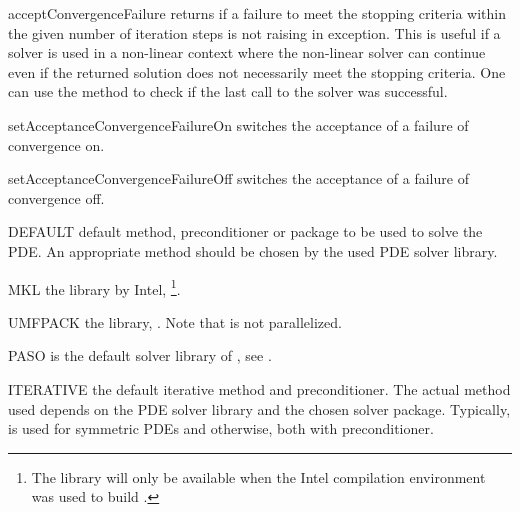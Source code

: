 \begin{methoddesc}[SolverOptions]{acceptConvergenceFailure}{}
returns \True if a failure to meet the stopping criteria within the given
number of iteration steps is not raising in exception. This is useful
if a solver is used in a non-linear context where the non-linear solver can
continue even if the returned solution does not necessarily meet the stopping
criteria. One can use the  method to check if the
last call to the solver was successful.
\end{methoddesc}

\begin{methoddesc}[SolverOptions]{setAcceptanceConvergenceFailureOn}{}
switches the acceptance of a failure of convergence on.
\end{methoddesc}

\begin{methoddesc}[SolverOptions]{setAcceptanceConvergenceFailureOff}{}
switches the acceptance of a failure of convergence off.
\end{methoddesc}
    
\begin{memberdesc}[SolverOptions]{DEFAULT}
default method, preconditioner or package to be used to solve the PDE.
An appropriate method should be chosen by the used PDE solver library.
\end{memberdesc}

\begin{memberdesc}[SolverOptions]{MKL}
the \MKL library by Intel, \footnote{The \MKL library will only be
available when the Intel compilation environment was used to build \escript.}.
\end{memberdesc}

\begin{memberdesc}[SolverOptions]{UMFPACK}
the \UMFPACK library, . Note that \UMFPACK is not parallelized.
\end{memberdesc}

\begin{memberdesc}[SolverOptions]{PASO}
\PASO is the default solver library of \finley, see .
\end{memberdesc}

\begin{memberdesc}[SolverOptions]{ITERATIVE}
the default iterative method and preconditioner. The actual method used
depends on the PDE solver library and the chosen solver package.
Typically, \PCG is used for symmetric PDEs and \BiCGStab otherwise, both with
\JACOBI preconditioner.
\end{memberdesc}

